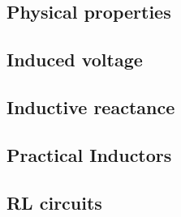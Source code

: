 \subsection{Physical properties}
\subsection{Induced voltage}
\subsection{Inductive reactance}
\subsection{Practical Inductors}
\subsection{RL circuits}
